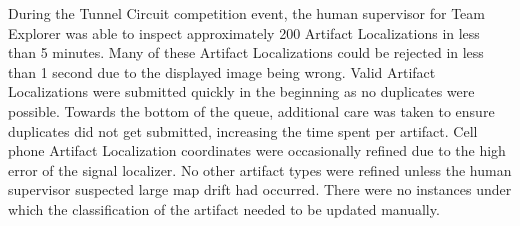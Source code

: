 During the Tunnel Circuit competition event, the human supervisor for Team Explorer was able to inspect approximately 200 Artifact Localizations in less than 5 minutes. Many of these Artifact Localizations could be rejected in less than 1 second due to the displayed image being wrong. Valid Artifact Localizations were submitted quickly in the beginning as no duplicates were possible. Towards the bottom of the queue, additional care was taken to ensure duplicates did not get submitted, increasing the time spent per artifact. Cell phone Artifact Localization coordinates were occasionally refined due to the high error of the signal localizer. No other artifact types were refined unless the human supervisor suspected large map drift had occurred. There were no instances under which the classification of the artifact needed to be updated manually.